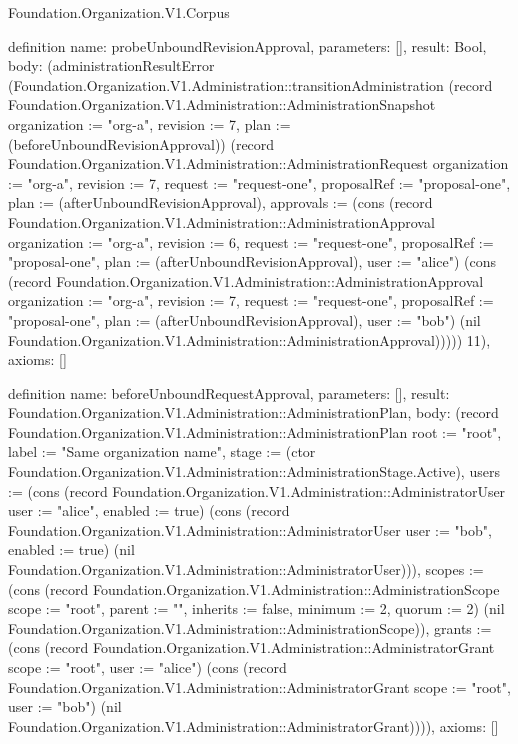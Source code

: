 \begin{lexlean}{Foundation.Organization.V1.Corpus}
\begin{semanticmodule}
definition{
  name: probeUnboundRevisionApproval,
  parameters: [],
  result: Bool,
  body: (administrationResultError (Foundation.Organization.V1.Administration::transitionAdministration (record Foundation.Organization.V1.Administration::AdministrationSnapshot {organization := "org-a", revision := 7, plan := (beforeUnboundRevisionApproval)}) (record Foundation.Organization.V1.Administration::AdministrationRequest {organization := "org-a", revision := 7, request := "request-one", proposalRef := "proposal-one", plan := (afterUnboundRevisionApproval), approvals := (cons (record Foundation.Organization.V1.Administration::AdministrationApproval {organization := "org-a", revision := 6, request := "request-one", proposalRef := "proposal-one", plan := (afterUnboundRevisionApproval), user := "alice"}) (cons (record Foundation.Organization.V1.Administration::AdministrationApproval {organization := "org-a", revision := 7, request := "request-one", proposalRef := "proposal-one", plan := (afterUnboundRevisionApproval), user := "bob"}) (nil Foundation.Organization.V1.Administration::AdministrationApproval)))})) 11),
  axioms: []
}

definition{
  name: beforeUnboundRequestApproval,
  parameters: [],
  result: Foundation.Organization.V1.Administration::AdministrationPlan,
  body: (record Foundation.Organization.V1.Administration::AdministrationPlan {root := "root", label := "Same organization name", stage := (ctor Foundation.Organization.V1.Administration::AdministrationStage.Active), users := (cons (record Foundation.Organization.V1.Administration::AdministratorUser {user := "alice", enabled := true}) (cons (record Foundation.Organization.V1.Administration::AdministratorUser {user := "bob", enabled := true}) (nil Foundation.Organization.V1.Administration::AdministratorUser))), scopes := (cons (record Foundation.Organization.V1.Administration::AdministrationScope {scope := "root", parent := "", inherits := false, minimum := 2, quorum := 2}) (nil Foundation.Organization.V1.Administration::AdministrationScope)), grants := (cons (record Foundation.Organization.V1.Administration::AdministratorGrant {scope := "root", user := "alice"}) (cons (record Foundation.Organization.V1.Administration::AdministratorGrant {scope := "root", user := "bob"}) (nil Foundation.Organization.V1.Administration::AdministratorGrant)))}),
  axioms: []
}


\end{semanticmodule}
\end{lexlean}
